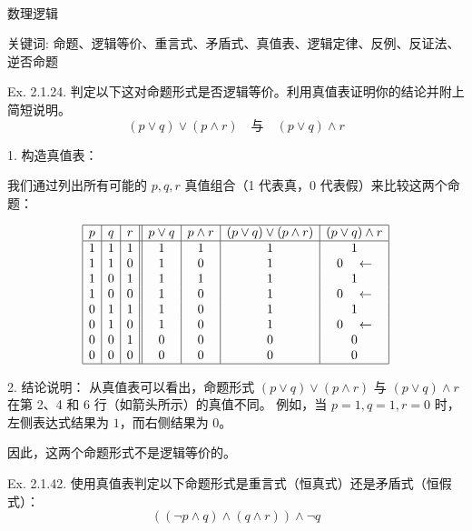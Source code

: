 \pagecolor{PageColor}
\
\vfil
\hfil  {\fontsize{50pt}{36pt}\selectfont{离散数学}} \hfil
\vfil

\thispagestyle{empty}
\pagebreak
\begin{center}
  {\fontsize{30pt}{26pt}\selectfont
    \hypertarget{数理逻辑}{数理逻辑} \label{数理逻辑}
  }
\end{center}
\separator
\begin{center}
    关键词: 命题、逻辑等价、重言式、矛盾式、真值表、逻辑定律、反例、反证法、逆否命题
\end{center}
\vspace{0.5pt}

\nopagecolor
\begin{questions}
    \question
Ex. 2.1.24. 判定以下这对命题形式是否逻辑等价。利用真值表证明你的结论并附上简短说明。
\[ (p \lor q) \lor (p \wedge r) \quad \text{与} \quad (p \lor q) \wedge r \]

\begin{solution}
1. 构造真值表：

我们通过列出所有可能的 $p, q, r$ 真值组合（1 代表真，0 代表假）来比较这两个命题：

\[
\begin{array}{|c|c|c||c|c|c|c|}
\hline
p & q & r & p \lor q & p \wedge r & (p \lor q) \lor (p \wedge r) & (p \lor q) \wedge r \\
\hline
1 & 1 & 1 & 1 & 1 & 1 & 1 \\
1 & 1 & 0 & 1 & 0 & 1 & 0 \quad \leftarrow \\
1 & 0 & 1 & 1 & 1 & 1 & 1 \\
1 & 0 & 0 & 1 & 0 & 1 & 0 \quad \leftarrow \\
0 & 1 & 1 & 1 & 0 & 1 & 1 \\
0 & 1 & 0 & 1 & 0 & 1 & 0 \quad \leftarrow \\
0 & 0 & 1 & 0 & 0 & 0 & 0 \\
0 & 0 & 0 & 0 & 0 & 0 & 0 \\
\hline
\end{array}
\]

2. 结论说明：
从真值表可以看出，命题形式 $(p \lor q) \lor (p \wedge r)$ 与 $(p \lor q) \wedge r$ 在第 2、4 和 6 行（如箭头所示）的真值不同。
 例如，当 $p=1, q=1, r=0$ 时，左侧表达式结果为 $1$，而右侧结果为 $0$。

因此，这两个命题形式不是逻辑等价的。
\end{solution}

\question
Ex. 2.1.42. 使用真值表判定以下命题形式是重言式（恒真式）还是矛盾式（恒假式）：
\[ ((\neg p \wedge q) \wedge (q \wedge r)) \wedge \neg q \]


\end{questions}
